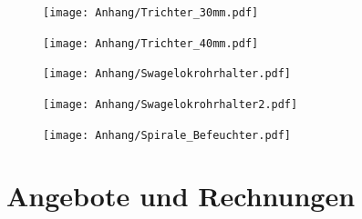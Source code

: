 \begin{figure}
	\texttt{[image: Anhang/Trichter\_30mm.pdf]}
\end{figure}

\begin{figure}  
	\texttt{[image: Anhang/Trichter\_40mm.pdf]}
\end{figure}

\begin{figure}  
	\texttt{[image: Anhang/Swagelokrohrhalter.pdf]}
\end{figure}

\begin{figure}  
	\texttt{[image: Anhang/Swagelokrohrhalter2.pdf]}
\end{figure}

\begin{figure}  
	\texttt{[image: Anhang/Spirale\_Befeuchter.pdf]}
\end{figure}

\clearpage


\section*{Angebote und Rechnungen}








